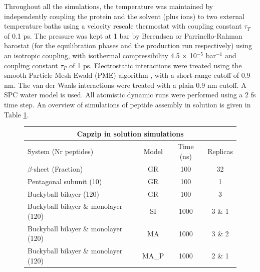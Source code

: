 Throughout all the simulations, the temperature was maintained by independently coupling the protein and the solvent (plus ions) to two external temperature baths using a velocity rescale thermostat \cite{Bussi2007} with coupling constant $\tau _T$ of 0.1 ps. The pressure was kept at 1 bar by Berendsen \cite{Berendsen1984} or Parrinello-Rahman barostat \cite{Parrinello1981} (for the equilibration phases and the production run respectively) using an isotropic coupling, with isothermal compressibility 4.5 $\times$ 10$^{-5}$ bar$^{-1}$ and coupling constant $\tau_P$ of 1 ps. Electrostatic interactions were treated using the smooth Particle Mesh Ewald (PME) algorithm \cite{Essmann1995}, with a short-range cutoff of 0.9 nm. The van der Waals interactions were treated with a plain 0.9 nm cutoff. A SPC water model \cite{Berendsen1981} is used. All atomistic dynamic runs were performed using a 2 fs time step. An overview of simulations of peptide assembly in solution is given in Table \ref{table:sim_solution}.

\begin{figure}[t]
\centering
 \def\arraystretch{1.6}
\begin{tabular}{l|ccc}
 \multicolumn{4}{c}{\textbf{Capzip in solution simulations}} \\
 \hline
 System (Nr peptides) & Model & Time (ns) & Replicas \\
 \hline
 $\beta$-sheet (Fraction) & GR & 100 & 32 \\
 Pentagonal subunit (10) & GR & 100 & 1 \\
 Buckyball bilayer (120) & GR & 100 & 3 \\
 Buckyball bilayer \& monolayer (120) & SI & 1000 & 3 \& 1 \\
 Buckyball bilayer \& monolayer (120) & MA & 1000 & 3 \& 2 \\
 Buckyball bilayer \& monolayer (120) & MA\_P & 1000 & 2 \& 1 \\
 \hline
 \end{tabular}
\label{table:sim_solution}
\end{figure}

